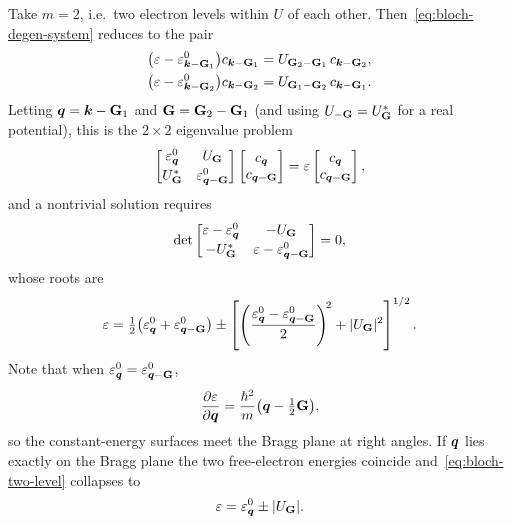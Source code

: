 \begin{example}
Take $m = 2$, i.e.\ two electron levels within $U$ of each other. Then~\eqref{eq:bloch-degen-system} reduces to the pair
\begin{align}
    \bigl(\varepsilon - \varepsilon^0_{\lvect{k}-\cvect{G}_1}\bigr) c_{\lvect{k}-\cvect{G}_1} &= U_{\cvect{G}_2-\cvect{G}_1}\, c_{\lvect{k}-\cvect{G}_2}, \\
    \bigl(\varepsilon - \varepsilon^0_{\lvect{k}-\cvect{G}_2}\bigr) c_{\lvect{k}-\cvect{G}_2} &= U_{\cvect{G}_1-\cvect{G}_2}\, c_{\lvect{k}-\cvect{G}_1}.
\end{align}
Letting $\lvect{q} = \lvect{k} - \cvect{G}_1$ and $\cvect{G} = \cvect{G}_2 - \cvect{G}_1$ (and using $U_{-\cvect{G}}=U^*_{\cvect{G}}$ for a real potential), this is the $2\times2$ eigenvalue problem
\begin{equation}
    \begin{bmatrix} \varepsilon^0_{\lvect{q}} & U_{\cvect{G}} \\[2pt] U^*_{\cvect{G}} & \varepsilon^0_{\lvect{q}-\cvect{G}} \end{bmatrix}
    \begin{bmatrix} c_{\lvect{q}} \\ c_{\lvect{q}-\cvect{G}} \end{bmatrix}
    = \varepsilon \begin{bmatrix} c_{\lvect{q}} \\ c_{\lvect{q}-\cvect{G}} \end{bmatrix},
\end{equation}
and a nontrivial solution requires
\begin{equation}
    \det \begin{bmatrix} \varepsilon - \varepsilon^0_{\lvect{q}} & -U_{\cvect{G}} \\[2pt] -U^*_{\cvect{G}} & \varepsilon - \varepsilon^0_{\lvect{q}-\cvect{G}} \end{bmatrix} = 0,
\end{equation}
whose roots are
\begin{equation}
    \varepsilon = \tfrac{1}{2}\bigl(\varepsilon^0_{\lvect{q}} + \varepsilon^0_{\lvect{q}-\cvect{G}}\bigr)
    \pm \left[ \left( \frac{\varepsilon^0_{\lvect{q}} - \varepsilon^0_{\lvect{q}-\cvect{G}}}{2} \right)^{\!2} + |U_{\cvect{G}}|^2 \right]^{1/2}.
    \label{eq:bloch-two-level}
\end{equation}
Note that when $\varepsilon^0_{\lvect{q}} = \varepsilon^0_{\lvect{q}-\cvect{G}}$,
\begin{equation}
    \pdv{\varepsilon}{\lvect{q}} = \frac{\hbar^2}{m}\bigl(\lvect{q} - \tfrac{1}{2}\cvect{G}\bigr),
\end{equation}
so the constant-energy surfaces meet the Bragg plane at right angles. If $\bm{q}$ lies exactly on the Bragg plane the two free-electron energies coincide and~\eqref{eq:bloch-two-level} collapses to
\begin{equation}
    \varepsilon = \varepsilon^0_{\lvect{q}} \pm |U_{\cvect{G}}|.
\end{equation}
\end{example}

